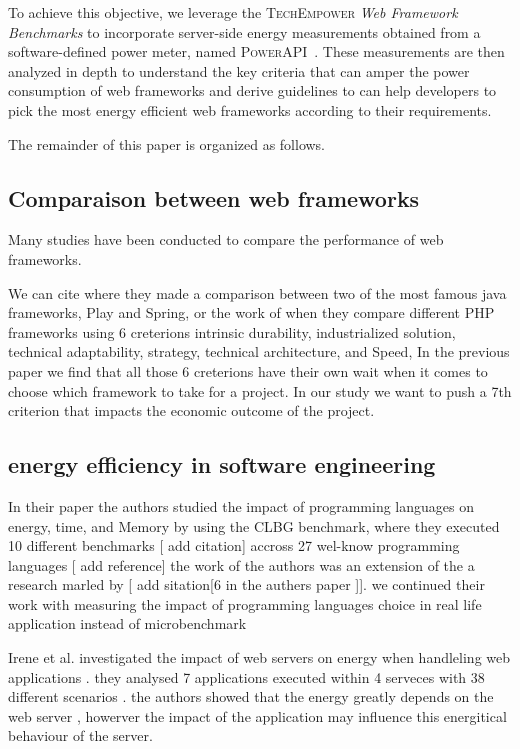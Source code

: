 To achieve this objective, we leverage the \textsc{TechEmpower} \emph{Web Framework Benchmarks} to incorporate server-side energy measurements obtained from a software-defined power meter, named \textsc{PowerAPI}~\cite{}.
These measurements are then analyzed in depth to understand the key criteria that can amper the power consumption of web frameworks and derive guidelines to can help developers to pick the most energy efficient web frameworks according to their requirements.

The remainder of this paper is organized as follows.

\subsection{Comparaison between web frameworks}

Many studies have been conducted to compare the performance of web frameworks.

We can cite \cite{gajewski_analysis_2019} where they made a comparison between two of the most famous java frameworks, Play and Spring, or the work of \cite{benmoussa_new_2019} when they compare different PHP frameworks using 6 creterions intrinsic durability, industrialized solution, technical adaptability, strategy, technical architecture, and Speed, In the previous paper we find that all those 6 creterions have their own wait when it comes to choose which framework to take for a project. In our study we want to push a 7th criterion that impacts the economic outcome of the project.


\subsection{energy efficiency in software engineering}

In their paper \cite{pereira_energy_2017} the authors studied the impact of programming languages on energy, time, and Memory by using the CLBG benchmark,
where they executed 10 different benchmarks [ add citation] accross 27 wel-know programming languages [ add reference]
the work of the authors was an extension of the a research marled by [ add sitation[6 in the authers paper ]]. we continued  their work  with measuring the impact of programming languages choice in real life application instead of microbenchmark


Irene et al.\cite{manotas_investigating_2013} investigated the impact of web servers on energy when handleling web applications . they analysed 7 applications executed within 4 serveces with 38 different scenarios . the authors showed that the energy greatly depends on the web server , howerver the impact of the application may influence this energitical behaviour of the server.


